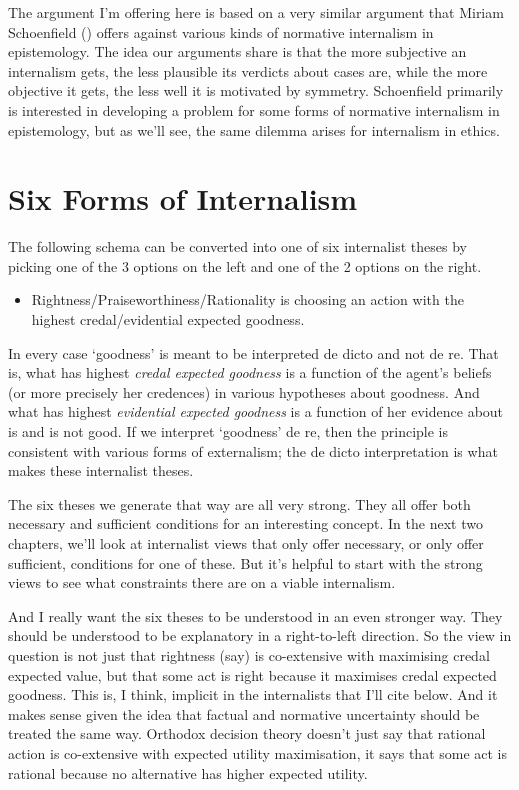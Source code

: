 \documentclass[
  10pt,
  letterpaper,
  twoside]{scrbook}
\providecommand{\tightlist}{%
  \setlength{\itemsep}{0pt}\setlength{\parskip}{0pt}}\usepackage{longtable,booktabs,array}
\begin{document}
The argument I'm offering here is based on a very similar argument that
Miriam Schoenfield () offers against
various kinds of normative internalism in epistemology. The idea our
arguments share is that the more subjective an internalism gets, the
less plausible its verdicts about cases are, while the more objective it
gets, the less well it is motivated by symmetry. Schoenfield primarily
is interested in developing a problem for some forms of normative
internalism in epistemology, but as we'll see, the same dilemma arises
for internalism in ethics.

\section{Six Forms of Internalism}\label{sixformsofinternalism}

The following schema can be converted into one of six internalist theses
by picking one of the 3 options on the left and one of the 2 options on
the right.

\begin{itemize}
\tightlist
\item
  Rightness/Praiseworthiness/Rationality is choosing an action with the
  highest credal/evidential expected goodness.
\end{itemize}

In every case `goodness' is meant to be interpreted de dicto and not de
re. That is, what has highest \emph{credal expected goodness} is a
function of the agent's beliefs (or more precisely her credences) in
various hypotheses about goodness. And what has highest \emph{evidential
expected goodness} is a function of her evidence about is and is not
good. If we interpret `goodness' de re, then the principle is consistent
with various forms of externalism; the de dicto interpretation is what
makes these internalist theses.

The six theses we generate that way are all very strong. They all offer
both necessary and sufficient conditions for an interesting concept. In
the next two chapters, we'll look at internalist views that only offer
necessary, or only offer sufficient, conditions for one of these. But
it's helpful to start with the strong views to see what constraints
there are on a viable internalism.

And I really want the six theses to be understood in an even stronger
way. They should be understood to be explanatory in a right-to-left
direction. So the view in question is not just that rightness (say) is
co-extensive with maximising credal expected value, but that some act is
right because it maximises credal expected goodness. This is, I think,
implicit in the internalists that I'll cite below. And it makes sense
given the idea that factual and normative uncertainty should be treated
the same way. Orthodox decision theory doesn't just say that rational
action is co-extensive with expected utility maximisation, it says that
some act is rational because no alternative has higher expected utility.
\end{document}
